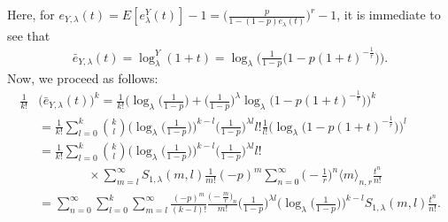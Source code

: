 \documentclass[a4paper,11pt]{amsart}
\begin{document}
Here, for $e_{Y,\lambda}(t)=E[e_{\lambda}^{Y}(t)]-1=\big(\frac{p}{1-(1-p)e_{\lambda}(t)} \big)^{r}-1$, it is immediate to see that
\begin{align*}
\bar{e}_{Y,\lambda}(t)=\log_{\lambda}^{Y}(1+t)=\log_{\lambda}\Big(\frac{1}{1-p}\big(1-p(1+t)^{-\frac{1}{r}} \big)\Big).
\end{align*}
Now, we proceed as follows:
\begin{align*}
\frac{1}{k!}&\big(\bar{e}_{Y,\lambda}(t)\big)^{k}=\frac{1}{k!}\Big(\log_{\lambda}\Big(\frac{1}{1-p}\Big)+\Big(\frac{1}{1-p}\Big)^{\lambda}\log_{\lambda}(1-p(1+t)^{-\frac{1}{r}}\big)\Big)^{k} \\
&=\frac{1}{k!}\sum_{l=0}^{k}\binom{k}{l}\Big(\log_{\lambda}\Big(\frac{1}{1-p}\Big)\Big)^{k-l}\Big(\frac{1}{1-p}\Big)^{\lambda l}l!\frac{1}{l!}\Big(\log_{\lambda}\big(1-p(1+t)^{-\frac{1}{r}}\big)\Big)^{l} \\
&=\frac{1}{k!}\sum_{l=0}^{k}\binom{k}{l}\Big(\log_{\lambda}\Big(\frac{1}{1-p}\Big)\Big)^{k-l}\Big(\frac{1}{1-p}\Big)^{\lambda l}l! \\
&\quad\quad\quad\quad \times \sum_{m=l}^{\infty}S_{1,\lambda}(m,l)\frac{1}{m!}(-p)^{m}\sum_{n=0}^{\infty}\Big(-\frac{1}{r}\Big)^{n}\langle m \rangle_{n,r}\frac{t^{n}}{n!} \\
&=\sum_{n=0}^{\infty}\sum_{l=0}^{k}\sum_{m=l}^{\infty}\frac{(-p)^{m}}{(k-l)!}\frac{\big(-\frac{m}{r}\big)_{n}}{m!}\Big(\frac{1}{1-p}\Big)^{\lambda l}\Big(\log_{\lambda}\Big(\frac{1}{1-p}\Big)\Big)^{k-l}S_{1,\lambda}(m,l) \frac{t^{n}}{n!}.
\end{align*}
\end{document}
